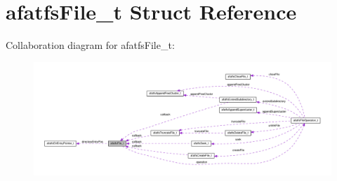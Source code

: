 \hypertarget{structafatfsFile__t}{\section{afatfs\+File\+\_\+t Struct Reference}
\label{structafatfsFile__t}
}


Collaboration diagram for afatfs\+File\+\_\+t\+:\nopagebreak
\begin{figure}[H]
\begin{center}
\leavevmode
\includegraphics[width=350pt]{structafatfsFile__t__coll__graph}
\end{center}
\end{figure}
